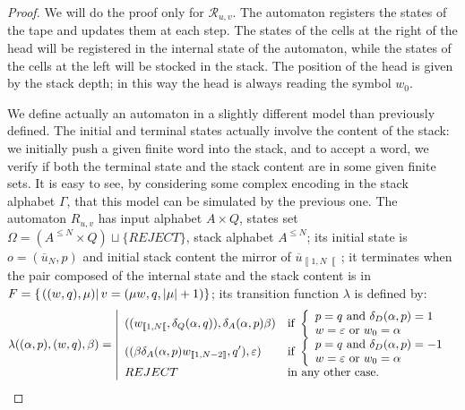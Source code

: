 \documentclass{llncs}
\newcommand{\length}[1]{\left|#1\right|}
\newcommand{\et}{\textrm{ and }}
\newcommand{\soit}[1]{\left|\everymath{\displaystyle\everymath{}}\begin{array}{ll}#1\end{array}\right.}
\newcommand{\both}[1]{\left\{\everymath{\displaystyle\everymath{}}\begin{array}{l}#1\end{array}\right.}
\newcommand{\co}[2]{\left\llbracket #1,#2\right\llbracket}\newcommand{\cc}[2]{\left\llbracket #1,#2\right\rrbracket}\newcommand{\oo}[2]{\left\rrbracket #1,#2\right\llbracket}\newcommand{\oc}[2]{\left\rrbracket #1,#2\right\rrbracket}\newcommand{\ci}[1]{\co{#1}\infty}\newcommand{\io}[1]{\oo{-\infty}{#1}}\newcommand{\oi}[1]{\oo{#1}\infty}\newcommand{\ic}[1]{\oc{-\infty}{#1}}
\newcommand{\scc}[2]{_{\cc{#1}{#2}}}\newcommand{\sco}[2]{_{\co{#1}{#2}}}\newcommand{\soo}[2]{_{\oo{#1}{#2}}}\newcommand{\soc}[2]{_{\oc{#1}{#2}}}\newcommand{\sci}[1]{_{\ci{#1}}}\newcommand{\sio}[1]{_{\io{#1}}}\newcommand{\soi}[1]{_{\oi{#1}}}\newcommand{\sic}[1]{_{\ic{#1}}}
\newcommand{\sett}[2]{\left\{\left.#1\vphantom{#2}\right|#2\right\}}
\begin{document}
\begin{proof}
We will do the proof only for $\mathcal R_{u,v}$.
The automaton registers the states of the tape and updates them at each step.
The states of the cells at the right of the head will be registered in the internal state of the automaton, while the states of the cells at the left will be stocked in the stack.
The position of the head is given by the stack depth; in this way the head is always reading the symbol $w_0$.

We define actually an automaton in a slightly different model than previously defined. The initial and terminal states actually involve the content of the stack: we initially push a given finite word into the stack, and to accept a word, we verify if both the terminal state and the stack content are in some given finite sets. It is easy to see, by considering some complex encoding in the stack alphabet $\Gamma$, that this model can be simulated by the previous one.
The automaton $R_{u,v}$ has input alphabet $A\times Q$, states set $\Omega=(A^{\le N}\times Q)\sqcup\{REJECT\}$, stack alphabet $A^{\le N}$; its initial state is $o=(\overline{u}_N,p)$ and initial stack content the mirror of $\overline u\sco1N$; it terminates when the pair composed of the internal state and the stack content is in $F=\sett{((w,q),\mu)}{v=(\mu w,q,\length\mu+1)}$; its transition function $\lambda$ is defined by:
\[\lambda((\alpha,p),(w,q),\beta)=\soit{
((w\sco1N,\delta_Q(\alpha,q)),\delta_A(\alpha,p)\beta) &
\textrm{if }\both{p=q\et\delta_D(\alpha,p)=1\\w=\varepsilon\text{ or } w_0=\alpha}\\
((\beta\delta_A(\alpha,p)w\scc1{N-2},q'),\varepsilon) &
\textrm{if }\both{p=q\et\delta_D(\alpha,p)=-1\\w=\varepsilon\text{ or } w_0=\alpha}\\
REJECT & \textrm{in any other case.}
}\]




\end{proof}
\end{document}
